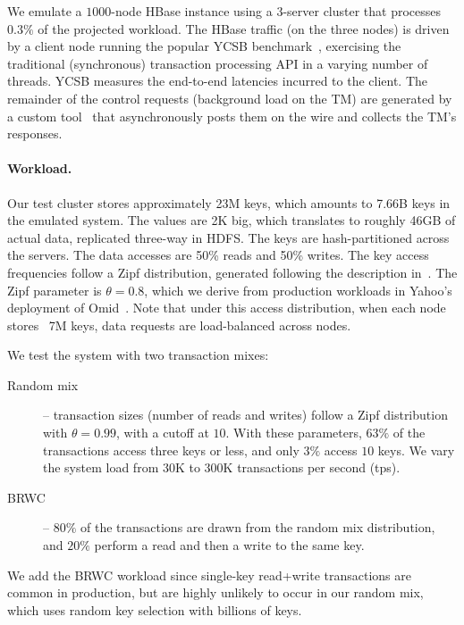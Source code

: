 We emulate a $1000$-node HBase instance using a $3$-server cluster that processes $0.3\%$ of the projected workload. 
The HBase traffic (on the three nodes) is driven by a client node running the popular YCSB benchmark~\cite{Cooper:2010:BCS:1807128.1807152}, 
exercising the traditional (synchronous) transaction processing API in a varying number of threads. YCSB measures the end-to-end latencies
incurred to the client. The remainder of the control requests (background load on the TM) are generated by a custom tool~\cite{Omid2017} 
that asynchronously posts them on the wire and collects the TM's responses. {}

\paragraph{Workload.}

Our test cluster stores approximately 23M keys, which amounts to 7.66B keys in the emulated system. 
The values are 2K big, which translates to roughly 46GB of actual data, replicated three-way in HDFS. The keys are hash-partitioned
across the servers. The data accesses are 50\% reads and 
50\% writes. The key access frequencies follow a Zipf distribution, generated following 
the description in~\cite{Gray:1994:QGB:191839.191886}. The Zipf parameter is $\theta=0.8$, which we derive from production 
workloads in Yahoo's deployment of Omid~\cite{Omid2017}. 
Note that under this access distribution, when each node stores ~7M keys, data requests are load-balanced across nodes.

We test the system with two transaction mixes:
\begin{description}
\item[Random mix] -- 
transaction sizes (number of reads and writes) follow a Zipf distribution with $\theta=0.99$, with a cutoff at $10$. 
With these parameters, $63\%$ of the transactions access three keys or less, and only $3\%$ access $10$ keys. 
We vary the system load from 30K to 300K transactions per second (tps). 
\item[BRWC] -- $80\%$ of the transactions are drawn from the random mix distribution, and $20\%$ perform a read
and then a write to the same key. 
\end{description}

We add the BRWC workload since single-key read+write transactions are common in production, but are highly unlikely to 
occur in our random mix, which uses random key selection with billions of keys.



